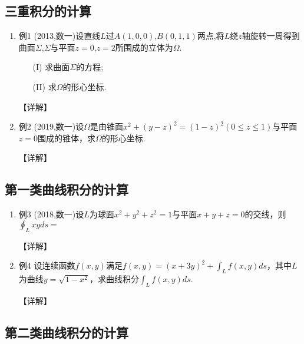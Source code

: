 \documentclass[12pt, a4paper, oneside, UTF8]{ctexbook}
\begin{document}
\subsection{三重积分的计算}

\begin{enumerate}[label=\arabic*.]
    \item 例1 (2013,数一)设直线$L$过$A(1,0,0)$,$B(0,1,1)$两点,将$L$绕$z$轴旋转一周得到曲面$\Sigma$,$\Sigma$与平面$z=0$,$z=2$所围成的立体为$\Omega$.
    \begin{enumerate}
        \item[(I)] 求曲面$\Sigma$的方程;
        \item[(II)] 求$\Omega$的形心坐标.
    \end{enumerate}
    
    \begin{solution}
    【详解】
    \end{solution}
    
    \item 例2 (2019,数一)设$\Omega$是由锥面$x^{2}+(y-z)^{2}=(1-z)^{2}(0\leq z\leq 1)$与平面$z=0$围成的锥体，求$\Omega$的形心坐标.
    
    \begin{solution}
    【详解】
    \end{solution}
\end{enumerate}

\subsection{第一类曲线积分的计算}

\begin{enumerate}[label=\arabic*.,start=3]
    \item 例3 (2018,数一)设$L$为球面$x^2+y^2+z^2=1$与平面$x+y+z=0$的交线，则$\oint_L xy ds=$
    
    \begin{solution}
    【详解】
    \end{solution}
    
    \item 例4 设连续函数$f(x,y)$满足$f(x,y)=(x+3y)^2+\int_L f(x,y) ds$，其中$L$为曲线$y=\sqrt{1-x^2}$，求曲线积分$\int_L f(x,y) ds$.
    
    \begin{solution}
    【详解】
    \end{solution}
\end{enumerate}

\subsection{第二类曲线积分的计算}
\end{document}
